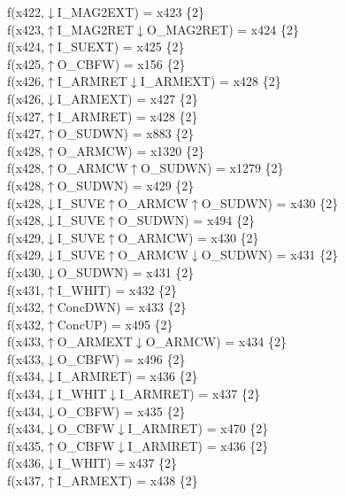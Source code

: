 f(x422,$\downarrow$I\_MAG2EXT) = x423 \{2\} \\  
f(x423,$\uparrow$I\_MAG2RET$\downarrow$O\_MAG2RET) = x424 \{2\} \\  
f(x424,$\uparrow$I\_SUEXT) = x425 \{2\} \\  
f(x425,$\uparrow$O\_CBFW) = x156 \{2\} \\  
f(x426,$\uparrow$I\_ARMRET$\downarrow$I\_ARMEXT) = x428 \{2\} \\  
f(x426,$\downarrow$I\_ARMEXT) = x427 \{2\} \\  
f(x427,$\uparrow$I\_ARMRET) = x428 \{2\} \\  
f(x427,$\uparrow$O\_SUDWN) = x883 \{2\} \\  
f(x428,$\uparrow$O\_ARMCW) = x1320 \{2\} \\  
f(x428,$\uparrow$O\_ARMCW$\uparrow$O\_SUDWN) = x1279 \{2\} \\  
f(x428,$\uparrow$O\_SUDWN) = x429 \{2\} \\  
f(x428,$\downarrow$I\_SUVE$\uparrow$O\_ARMCW$\uparrow$O\_SUDWN) = x430 \{2\} \\  
f(x428,$\downarrow$I\_SUVE$\uparrow$O\_SUDWN) = x494 \{2\} \\  
f(x429,$\downarrow$I\_SUVE$\uparrow$O\_ARMCW) = x430 \{2\} \\  
f(x429,$\downarrow$I\_SUVE$\uparrow$O\_ARMCW$\downarrow$O\_SUDWN) = x431 \{2\} \\  
f(x430,$\downarrow$O\_SUDWN) = x431 \{2\} \\  
f(x431,$\uparrow$I\_WHIT) = x432 \{2\} \\  
f(x432,$\uparrow$ConcDWN) = x433 \{2\} \\  
f(x432,$\uparrow$ConcUP) = x495 \{2\} \\  
f(x433,$\uparrow$O\_ARMEXT$\downarrow$O\_ARMCW) = x434 \{2\} \\  
f(x433,$\downarrow$O\_CBFW) = x496 \{2\} \\  
f(x434,$\downarrow$I\_ARMRET) = x436 \{2\} \\  
f(x434,$\downarrow$I\_WHIT$\downarrow$I\_ARMRET) = x437 \{2\} \\  
f(x434,$\downarrow$O\_CBFW) = x435 \{2\} \\  
f(x434,$\downarrow$O\_CBFW$\downarrow$I\_ARMRET) = x470 \{2\} \\  
f(x435,$\uparrow$O\_CBFW$\downarrow$I\_ARMRET) = x436 \{2\} \\  
f(x436,$\downarrow$I\_WHIT) = x437 \{2\} \\  
f(x437,$\uparrow$I\_ARMEXT) = x438 \{2\} \\  
